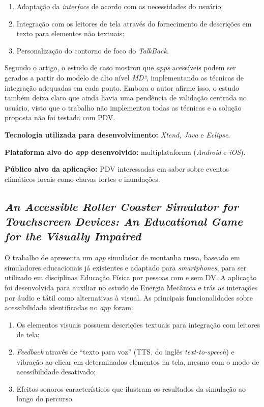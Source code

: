 \begin{enumerate}
    \item Adaptação da \emph{interface} de acordo com as necessidades do usuário;
    \item Integração com os leitores de tela através do fornecimento de descrições em texto para elementos não textuais;
    \item Personalização do contorno de foco do \emph{TalkBack}.
\end{enumerate}

Segundo o artigo, o estudo de caso mostrou que \emph{apps} acessíveis podem ser gerados a partir do modelo de alto nível \emph{MD²}, implementando as técnicas de integração adequadas em cada ponto.
Embora o autor afirme isso, o estudo também deixa claro que ainda havia uma pendência de validação centrada no usuário, visto que o trabalho não implementou todas as técnicas e a solução proposta não foi testada com PDV\@.

\textbf{Tecnologia utilizada para desenvolvimento:} \emph{Xtend, Java} e \emph{Eclipse}.

\textbf{Plataforma alvo do \emph{app} desenvolvido:} multiplataforma (\emph{Android} e \emph{iOS}).

\textbf{Público alvo da aplicação:} PDV interessadas em saber sobre eventos climáticos locais como chuvas fortes e inundações.

\subsection{\emph{An Accessible Roller Coaster Simulator for Touchscreen Devices: An Educational Game for the Visually Impaired}}

O trabalho de  apresenta um \emph{app} simulador de montanha russa, baseado em simuladores educacionais já existentes e adaptado para \emph{smartphones}, para ser utilizado em disciplinas Educação Física por pessoas com e sem DV\@.
A aplicação foi desenvolvida para auxiliar no estudo de Energia Mecânica e trás as interações por áudio e tátil como alternativas à visual.
As principais funcionalidades sobre acessibilidade identificadas no \emph{app} foram:

\begin{enumerate}
    \item Os elementos visuais possuem descrições textuais para integração com leitores de tela;
    \item \emph{Feedback} através de ``texto para voz'' (TTS, do inglês \emph{text-to-speech}) e vibração ao clicar em determinados elementos na tela, mesmo com o modo de acessibilidade desativado;
    \item Efeitos sonoros característicos que ilustram os resultados da simulação ao longo do percurso.
\end{enumerate}


